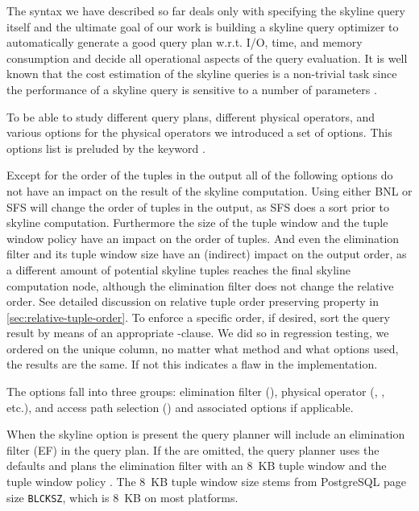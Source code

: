 The syntax we have described so far deals only with specifying the
skyline query itself and the ultimate goal of our work is building a
skyline query optimizer to automatically generate a good query plan
w.r.t. I/O, time, and memory consumption and decide all operational
aspects of the query evaluation.  It is well known that the cost
estimation of the skyline queries is a non-trivial task
\citep{Chaudhuri2006} since the performance of a skyline query is
sensitive to a number of parameters \citep{Godfrey2007}.

To be able to study different query plans, different physical
operators, and various options for the physical operators we
introduced a set of options. This options list is preluded by the
keyword .

Except for the order of the tuples in the output all of the following
options do not have an impact on the result of the skyline
computation. Using either BNL or SFS will change the order of tuples in
the output, as SFS does a sort prior to skyline
computation. Furthermore the size of the tuple window and the tuple
window policy have an impact on the order of tuples. And even the
elimination filter and its tuple window size have an (indirect) impact on the
output order, as a different amount of potential skyline tuples reaches
the final skyline computation node, although the elimination filter
does not change the relative order.  See detailed discussion on
relative tuple order preserving property in
\autoref{sec:relative-tuple-order}.  
To enforce a specific order, if
desired, sort the query result by means of an appropriate
-clause.  
We did so in regression testing, we
ordered on the unique  column, no matter what method and
what options used, the results are the same. If not this indicates a
flaw in the implementation.

The options fall into three groups: elimination filter
(), physical operator (, ,
etc.), and access path selection () and associated
options if applicable.

When the skyline option  is present the query planner
will include an elimination filter (EF) in the query plan.
If the
 are omitted, the query planner uses the defaults
and plans the elimination filter with an 8~KB tuple window and the
tuple window policy . The 8~KB tuple window size
stems from PostgreSQL page size \texttt{BLCKSZ}, which is 8~KB on most
platforms.

